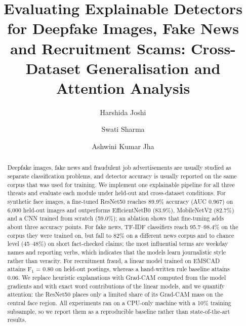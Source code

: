 \documentclass[runningheads]{llncs}
\begin{document}
%
\title{Evaluating Explainable Detectors for Deepfake Images, Fake News and Recruitment Scams: Cross-Dataset Generalisation and Attention Analysis}
%
%
\author{Harshida Joshi \and
Swati Sharma \and
Ashwini Kumar Jha}
%
%
%
\maketitle
%
\begin{abstract}
Deepfake images, fake news and fraudulent job advertisements are usually studied as separate classification problems, and detector accuracy is usually reported on the same corpus that was used for training. We implement one explainable pipeline for all three threats and evaluate each module under held-out and cross-dataset conditions. For synthetic face images, a fine-tuned ResNet50 reaches 89.9\% accuracy (AUC 0.967) on 6,000 held-out images and outperforms EfficientNetB0 (83.9\%), MobileNetV2 (82.7\%) and a CNN trained from scratch (59.0\%); an ablation shows that fine-tuning adds about three accuracy points. For fake news, TF-IDF classifiers reach 95.7--98.4\% on the corpus they were trained on, but fall to 82\% on a different news corpus and to chance level (45--48\%) on short fact-checked claims; the most influential terms are weekday names and reporting verbs, which indicates that the models learn journalistic style rather than veracity. For recruitment fraud, a linear model trained on EMSCAD attains F$_1$ = 0.80 on held-out postings, whereas a hand-written rule baseline attains 0.06. We replace heuristic explanations with Grad-CAM computed from the model gradients and with exact word contributions of the linear models, and we quantify attention: the ResNet50 places only a limited share of its Grad-CAM mass on the central face region. All experiments ran on a CPU-only machine with a 10\% training subsample, so we report them as a reproducible baseline rather than state-of-the-art results.
\end{abstract}
%
\end{document}
